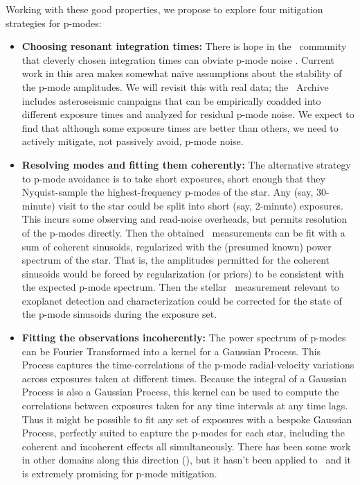 \documentclass[12pt, letterpaper]{article}
\begin{document}
Working with these good properties, we propose to explore four
mitigation strategies for p-modes:
\begin{itemize}
\item
\textbf{Choosing resonant integration times:}
There is hope in the \EPRV\ community that cleverly chosen integration
times can obviate p-mode noise \citep[see, \eg][]{Chaplin2019}.
Current work in this area makes somewhat na\"ive assumptions about the
stability of the p-mode amplitudes.
We will revisit this with real data; the \HARPS\ Archive includes
asteroseismic campaigns that can be empirically coadded into different
exposure times and analyzed for residual p-mode noise.
We expect to find that although some exposure times are better than
others, we need to actively mitigate, not passively avoid, p-mode
noise.
\item
\textbf{Resolving modes and fitting them coherently:}
The alternative strategy to p-mode avoidance is to take short exposures,
short enough that they Nyquist-sample the highest-frequency p-modes of
the star.
Any (say, 30-minute) visit to the star could be split into short (say,
2-minute) exposures.
This incurs some observing and read-noise overheads, but permits
resolution of the p-modes directly.
Then the obtained \RV\ measurements can be fit with a sum of coherent
sinusoids, regularized with the (presumed known) power spectrum of the
star.
That is, the amplitudes permitted for the coherent sinusoids would be
forced by regularization (or priors) to be consistent with the
expected p-mode spectrum.
Then the stellar \RV\ measurement relevant to exoplanet detection and
characterization could be corrected for the state of the p-mode
sinusoids during the exposure set.
\item
\textbf{Fitting the observations incoherently:}
The power spectrum of p-modes can be Fourier Transformed into a kernel
for a Gaussian Process.
This Process captures the time-correlations of the p-mode
radial-velocity variations across exposures taken at different times.
Because the integral of a Gaussian Process is also a Gaussian Process,
this kernel can be used to compute the correlations between exposures
taken for any time intervals at any time lags.
Thus it might be possible to fit any set of exposures with a bespoke
Gaussian Process, perfectly suited to capture the p-modes for each
star, including the coherent and incoherent effects all simultaneously.
There has been some work in other domains along this direction (\citealt{DFMGP}),
but it hasn't been applied to \EPRV\ and it is extremely
promising for p-mode mitigation.

\end{itemize}
\end{document}
